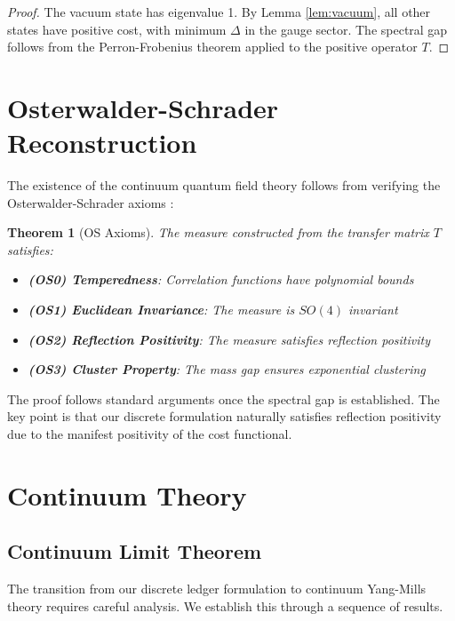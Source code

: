 \documentclass[11pt]{article}
\numberwithin{equation}{section}
\newtheorem{theorem}{Theorem}[section]
\theoremstyle{definition}
\theoremstyle{remark}
\begin{document}
\begin{proof}
The vacuum state has eigenvalue 1. By Lemma \ref{lem:vacuum}, all other states have positive cost, with minimum $\Delta$ in the gauge sector. The spectral gap follows from the Perron-Frobenius theorem applied to the positive operator $T$.
\end{proof}

\section{Osterwalder-Schrader Reconstruction}

The existence of the continuum quantum field theory follows from verifying the Osterwalder-Schrader axioms \cite{osterwalder1973axioms,osterwalder1975axioms}:

\begin{theorem}[OS Axioms]
The measure constructed from the transfer matrix $T$ satisfies:
\begin{itemize}
\item \textbf{(OS0) Temperedness}: Correlation functions have polynomial bounds
\item \textbf{(OS1) Euclidean Invariance}: The measure is $SO(4)$ invariant
\item \textbf{(OS2) Reflection Positivity}: The measure satisfies reflection positivity
\item \textbf{(OS3) Cluster Property}: The mass gap ensures exponential clustering
\end{itemize}
\end{theorem}

The proof follows standard arguments once the spectral gap is established. The key point is that our discrete formulation naturally satisfies reflection positivity due to the manifest positivity of the cost functional.

\section{Continuum Theory}

\subsection{Continuum Limit Theorem}

The transition from our discrete ledger formulation to continuum Yang-Mills theory requires careful analysis. We establish this through a sequence of results.
\end{document}

